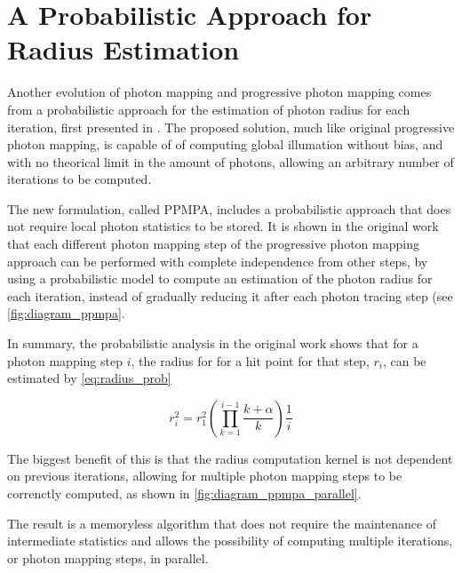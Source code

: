 \documentclass[main.tex]{subfiles}
\begin{document}
\section{A Probabilistic Approach for Radius Estimation} \label{section:ppmpa}

Another evolution of photon mapping and progressive photon mapping comes from a probabilistic approach for the estimation of photon radius for each iteration, first presented in \cite{knaus2011progressive}. The proposed solution, much like original progressive photon mapping, is capable of of computing global illumation without bias, and with no theorical limit in the amount of photons, allowing an arbitrary number of iterations to be computed.

The new formulation, called PPMPA, includes a probabilistic approach that does not require local photon statistics to be stored. It is shown in the original work that each different photon mapping step of the progressive photon mapping approach can be performed with complete independence from other steps, by using a probabilistic model to compute an estimation of the photon radius for each iteration, instead of gradually reducing it after each photon tracing step (see \cref{fig:diagram_ppmpa}.


In summary, the probabilistic analysis in the original work shows that for a photon mapping step $i$, the radius for for a hit point for that step, $r_{i}$, can be estimated by \cref{eq:radius_prob}

\begin{figure}[!htp]
  \begin{equation}
    r^{2}_{i} = r^{2}_{1} (\prod\limits^{i-1}_{k=1} \frac{k + \alpha}{k}) \frac{1}{i}
  \label{eq:radius_prob}
  \end{equation}
\end{figure}


The biggest benefit of this is that the radius computation kernel is not dependent on previous iterations, allowing for multiple photon mapping steps to be correnctly computed, as shown in \cref{fig:diagram_ppmpa_parallel}.


The result is a memoryless algorithm that does not require the maintenance of intermediate statistics and allows the possibility of computing multiple iterations, or photon mapping steps, in parallel.

\end{document}
